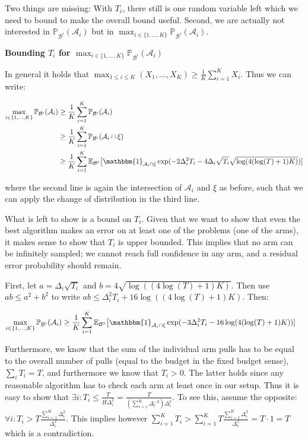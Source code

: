 \documentclass[11pt,]{article}
\begin{document}
Two things are missing: With \(T_i\), there still is one random variable
left which we need to bound to make the overall bound useful. Second, we
are actually not interested in
\(\mathbb{P}_{\mathcal{B}^i}(\mathcal{A}_i)\) but in
\(\max_{i \in \{1,\dots,K\}} \mathbb{P}_{\mathcal{B}^i}(\mathcal{A}_i)\).

\textbf{Bounding \(T_i\) for
\(\max_{i \in \{1,\dots,K\}}\mathbb{P}_{\mathcal{B}^i}(\mathcal{A}_i)\)}

In general it holds that
\(\max_{1 \leq i \leq K} (X_1, \dots, X_K) \geq \frac{1}{K}\sum_{i=1}^K X_i\).
Thus we can write:

\begin{align*}
\max_{i \in \{1,\dots,K\}} \mathbb{P}_{\mathcal{B}^i}(\mathcal{A}_i) & \geq \frac{1}{K} \sum_{i=1}^{K} \mathbb{P}_{\mathcal{B}^i}(\mathcal{A}_i) \\
& \geq \frac{1}{K} \sum_{i=1}^{K} \mathbb{P}_{\mathcal{B}^i}(\mathcal{A}_i \cap \xi) \\
& \geq \frac{1}{K} \sum_{i=1}^{K} \mathbb{E}_{\mathcal{B}^0} \big[\mathbbm{1}_{\mathcal{A}_i \cap \xi} \exp (- 2 \Delta_i^2 T_i - 4 \Delta_i \sqrt{T_i} \sqrt{\log(4(\log(T)+1)K)}) ]
\end{align*}

where the second line is again the intersection of \(\mathcal{A}_i\) and
\(\xi\) as before, such that we can apply the change of distribution in
the third line.

What is left to show is a bound on \(T_i\). Given that we want to show
that even the best algorithm makes an error on at least one of the
problems (one of the arms), it makes sense to show that \(T_i\) is upper
bounded. This implies that no arm can be infinitely sampled; we cannot
reach full confidence in any arm, and a residual error probability
should remain.

First, let \(a = \Delta_i \sqrt{T_i}\) and
\(b = 4\sqrt{\log((4\log(T)+1)K)}\). Then use \(ab \leq a^2 + b^2\) to
write \(ab \leq \Delta_i^2 T_i + 16\log((4\log(T)+1)K)\). Then:

\begin{align*}
\max_{i \in \{1,\dots,K\}} \mathbb{P}_{\mathcal{B}^i}(\mathcal{A}_i) & \geq \frac{1}{K} \sum_{i=1}^{K} \mathbb{E}_{\mathcal{B}^0} \big[\mathbbm{1}_{\mathcal{A}_i \cap \xi} \exp (- 3 \Delta_i^2 T_i - 16 \log(4(\log(T)+1)K)) ]
\end{align*}

Furthermore, we know that the sum of the individual arm pulls has to be
equal to the overall number of pulls (equal to the budget in the fixed
budget sense), \(\sum_i T_i = T\), and furthermore we know that
\(T_i>0\). The latter holds since any reasonable algorithm has to check
each arm at least once in our setup. Thus it is easy to show that
\(\exists i: T_i \leq \frac{T}{H \Delta_i^2} = \frac{T}{(\sum_{i=1}^{K} \Delta_i^{-2}) \Delta_i^2}\).
To see this, assume the opposite:
\(\forall i: T_i > T \frac{\sum_{i=1}^K \Delta_i^2}{\Delta_i^2}\). This
implies however
\(\sum_{i=1}^K T_i > \sum_{i=1}^K T \frac{\sum_{i=1}^K \Delta_i^2}{\Delta_i^2} = T \cdot 1 = T\)
which is a contradiction.
\end{document}
